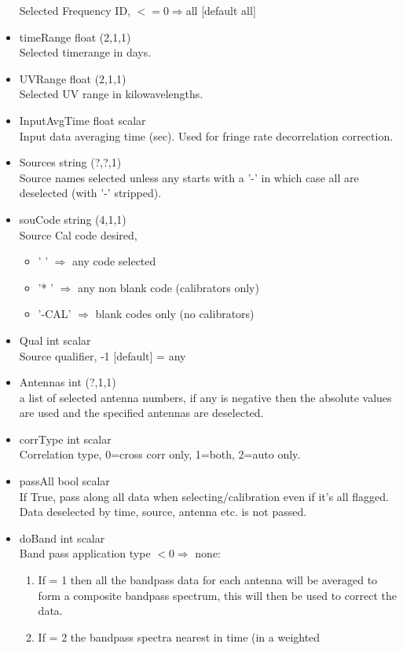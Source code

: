 \documentclass[11pt]{report}
\begin{document}
\begin{itemize}
Selected Frequency ID, $<=0 \Rightarrow$all [default all]
\item  timeRange float (2,1,1) \\
Selected timerange in days.
\item  UVRange float (2,1,1) \\
Selected UV range in kilowavelengths.
\item  InputAvgTime float scalar \\ 
Input data averaging time (sec). Used for fringe rate decorrelation correction.
\item  Sources string (?,?,1) \\
Source names selected unless any starts with
a '-' in which case all are deselected (with '-' stripped).
\item  souCode string (4,1,1) \\
Source Cal code desired, 
\begin{itemize}
\item '    ' $\Rightarrow$ any code selected
\item '*   ' $\Rightarrow$ any non blank code (calibrators only)
\item '-CAL' $\Rightarrow$ blank codes only  (no calibrators)
\end{itemize}
\item  Qual    int scalar \\  
Source qualifier, -1 [default] = any
\item  Antennas int (?,1,1) \\
a list of selected antenna numbers, if any is negative
then the absolute values are used and the specified antennas are deselected.
\item  corrType int scalar \\
Correlation type, 0=cross corr only, 1=both, 2=auto only.
\item  passAll bool scalar \\
If True, pass along all data when selecting/calibration
even if it's all flagged.  
Data deselected by time, source, antenna etc. is not passed.
\item  doBand  int scalar \\
Band pass application type $<0 \Rightarrow$ none:
\begin{enumerate}
\item If = 1 then all the bandpass data for each antenna
will be averaged to form a composite bandpass
spectrum, this will then be used to correct the data.
\item If = 2 the bandpass spectra nearest in time (in a weighted

\end{enumerate}
\end{itemize}
\end{document}

